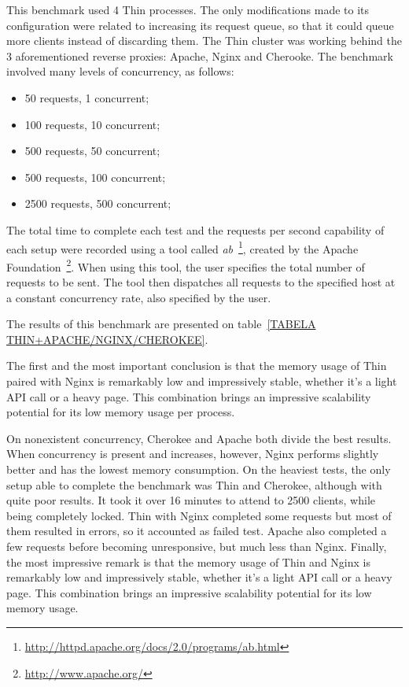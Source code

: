 This benchmark used 4 Thin processes. The only modifications made to its configuration were related to increasing its request queue, so that it could queue more clients instead of discarding them. The Thin cluster was working behind the 3 aforementioned reverse proxies: Apache, Nginx and Cherooke. The benchmark involved many levels of concurrency, as follows:
\begin{itemize}
  \item 50 requests, 1 concurrent;
  \item 100 requests, 10 concurrent;
  \item 500 requests, 50 concurrent;
  \item 500 requests, 100 concurrent;
  \item 2500 requests, 500 concurrent;
\end{itemize}
The total time to complete each test and the requests per second capability of each setup were recorded using a tool called \textit{ab}~\footnote{\url{http://httpd.apache.org/docs/2.0/programs/ab.html}}, created by the Apache Foundation~\footnote{\url{http://www.apache.org/}}. When using this tool, the user specifies the total number of requests to be sent. The tool then dispatches all requests to the specified host at a constant concurrency rate, also specified by the user.

The results of this benchmark are presented on table~\ref{TABELA THIN+APACHE/NGINX/CHEROKEE}.

The first and the most important conclusion is that the memory usage of Thin paired with Nginx is remarkably low and impressively stable, whether it's a light API call or a heavy page. This combination brings an impressive scalability potential for its low memory usage per process.

On nonexistent concurrency, Cherokee and Apache both divide the best results. When concurrency is present and increases, however, Nginx performs slightly better and has the lowest memory consumption. On the heaviest tests, the only setup able to complete the benchmark was Thin and Cherokee, although with quite poor results. It took it over 16 minutes to attend to 2500 clients, while being completely locked. Thin with Nginx completed some requests but most of them resulted in errors, so it accounted as failed test. Apache also completed a few requests before becoming unresponsive, but much less than Nginx. Finally, the most impressive remark is that the memory usage of Thin and Nginx is remarkably low and impressively stable, whether it's a light API call or a heavy page. This combination brings an impressive scalability potential for its low memory usage.

